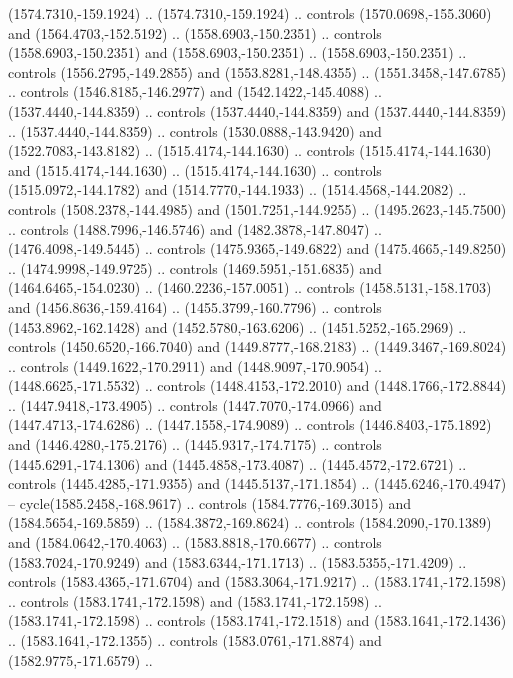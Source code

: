 \begin{scope}[shift={(-22.88722,-49.76189)}]
\begin{scope}[shift={(-739.46591,328.36782)}]
      (1574.7310,-159.1924) .. (1574.7310,-159.1924) .. controls
      (1570.0698,-155.3060) and (1564.4703,-152.5192) .. (1558.6903,-150.2351) ..
      controls (1558.6903,-150.2351) and (1558.6903,-150.2351) ..
      (1558.6903,-150.2351) .. controls (1556.2795,-149.2855) and
      (1553.8281,-148.4355) .. (1551.3458,-147.6785) .. controls
      (1546.8185,-146.2977) and (1542.1422,-145.4088) .. (1537.4440,-144.8359) ..
      controls (1537.4440,-144.8359) and (1537.4440,-144.8359) ..
      (1537.4440,-144.8359) .. controls (1530.0888,-143.9420) and
      (1522.7083,-143.8182) .. (1515.4174,-144.1630) .. controls
      (1515.4174,-144.1630) and (1515.4174,-144.1630) .. (1515.4174,-144.1630) ..
      controls (1515.0972,-144.1782) and (1514.7770,-144.1933) ..
      (1514.4568,-144.2082) .. controls (1508.2378,-144.4985) and
      (1501.7251,-144.9255) .. (1495.2623,-145.7500) .. controls
      (1488.7996,-146.5746) and (1482.3878,-147.8047) .. (1476.4098,-149.5445) ..
      controls (1475.9365,-149.6822) and (1475.4665,-149.8250) ..
      (1474.9998,-149.9725) .. controls (1469.5951,-151.6835) and
      (1464.6465,-154.0230) .. (1460.2236,-157.0051) .. controls
      (1458.5131,-158.1703) and (1456.8636,-159.4164) .. (1455.3799,-160.7796) ..
      controls (1453.8962,-162.1428) and (1452.5780,-163.6206) ..
      (1451.5252,-165.2969) .. controls (1450.6520,-166.7040) and
      (1449.8777,-168.2183) .. (1449.3467,-169.8024) .. controls
      (1449.1622,-170.2911) and (1448.9097,-170.9054) .. (1448.6625,-171.5532) ..
      controls (1448.4153,-172.2010) and (1448.1766,-172.8844) ..
      (1447.9418,-173.4905) .. controls (1447.7070,-174.0966) and
      (1447.4713,-174.6286) .. (1447.1558,-174.9089) .. controls
      (1446.8403,-175.1892) and (1446.4280,-175.2176) .. (1445.9317,-174.7175) ..
      controls (1445.6291,-174.1306) and (1445.4858,-173.4087) ..
      (1445.4572,-172.6721) .. controls (1445.4285,-171.9355) and
      (1445.5137,-171.1854) .. (1445.6246,-170.4947) -- cycle(1585.2458,-168.9617)
      .. controls (1584.7776,-169.3015) and (1584.5654,-169.5859) ..
      (1584.3872,-169.8624) .. controls (1584.2090,-170.1389) and
      (1584.0642,-170.4063) .. (1583.8818,-170.6677) .. controls
      (1583.7024,-170.9249) and (1583.6344,-171.1713) .. (1583.5355,-171.4209) ..
      controls (1583.4365,-171.6704) and (1583.3064,-171.9217) ..
      (1583.1741,-172.1598) .. controls (1583.1741,-172.1598) and
      (1583.1741,-172.1598) .. (1583.1741,-172.1598) .. controls
      (1583.1741,-172.1518) and (1583.1641,-172.1436) .. (1583.1641,-172.1355) ..
      controls (1583.0761,-171.8874) and (1582.9775,-171.6579) ..

\end{scope}
\end{scope}
